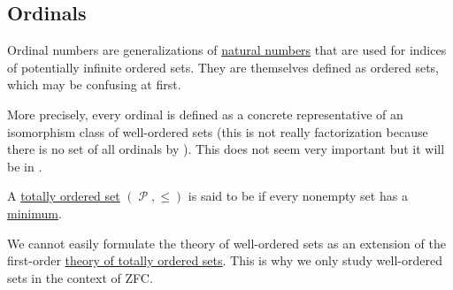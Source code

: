 \subsection{Ordinals}\label{subsec:ordinals}

\begin{remark}\label{rem:ordinal_is_equivalence_class}
  Ordinal numbers are generalizations of \hyperref[def:set_of_natural_numbers]{natural numbers} that are used for indices of potentially infinite ordered sets. They are themselves defined as ordered sets, which may be confusing at first.

  More precisely, every ordinal is defined as a concrete representative of an isomorphism class of well-ordered sets (this is not really factorization because there is no set of all ordinals by ). This does not seem very important but it will be in .
\end{remark}

\begin{definition}\label{def:well_ordered_set}
  A \hyperref[def:totally_ordered_set]{totally ordered set} \( (\mscrP, \leq) \) is said to be  if every nonempty set has a \hyperref[def:poset_extremal_points/maximum_and_minimum]{minimum}.

  We cannot easily formulate the theory of well-ordered sets as an extension of the first-order \hyperref[def:totally_ordered_set]{theory of totally ordered sets}. This is why we only study well-ordered sets in the context of ZFC.
\end{definition}


